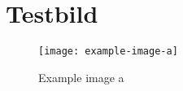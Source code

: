 \documentclass[
    load-dhbw-templates,                  %
    auto-intro-pages,                     %
    add-tocs-to-toc,                      %
    mainlanguage = ngerman,               %
    debug                                 %
]{iodhbwm}
\begin{document}
    \chapter{Testbild}
        \blindtext
        
        \begin{figure}
            \texttt{[image: example-image-a]}
            \caption{Example image a}
        \end{figure}
    
        \blindtext
    
    \Blinddocument
\end{document}
